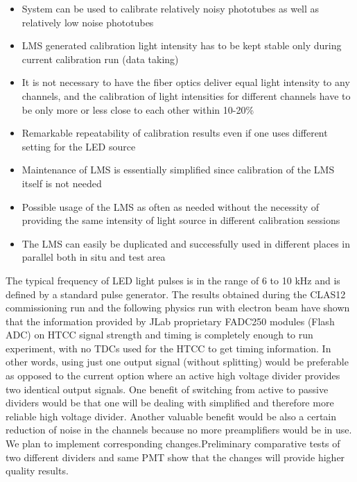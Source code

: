  \begin{itemize}
     \item System can be used to calibrate relatively noisy phototubes as well as relatively low noise phototubes
     \item LMS generated calibration light intensity has to be kept stable only during current calibration run (data taking)
     \item It is not necessary to have the fiber optics deliver equal light intensity to any channels, and the calibration of light intensities for different channels have to be only more or less close to each other within 10-20\%
     \item Remarkable repeatability of calibration results even if one uses different setting for the LED source
     \item Maintenance of LMS is essentially simplified since calibration of the LMS itself is not needed
     \item Possible usage of the LMS as often as needed without the necessity of providing the same intensity of light source in different calibration sessions
     \item The LMS can easily be duplicated and successfully used in different places in parallel both in situ and test area
 \end{itemize}

\indent The typical frequency of LED light pulses is in the range of 6 to 10 kHz and is defined by a standard pulse generator. The results obtained during the CLAS12 commissioning run and the following physics run with electron beam have shown that the information provided by JLab proprietary FADC250 modules (Flash ADC) on HTCC signal strength and timing is completely enough to run experiment, with no TDCs used for the HTCC to get timing information. In other words, using just one output signal (without splitting) would be preferable as opposed to the current option where an active high voltage divider provides two identical output signals. One benefit of switching from active to passive dividers would be that one will be dealing with simplified and therefore more reliable high voltage divider. Another valuable benefit would be also a certain reduction of noise in the channels because no more preamplifiers would be in use. We plan to implement corresponding changes.Preliminary comparative tests of two different dividers and same PMT show that the changes will provide higher quality results.
